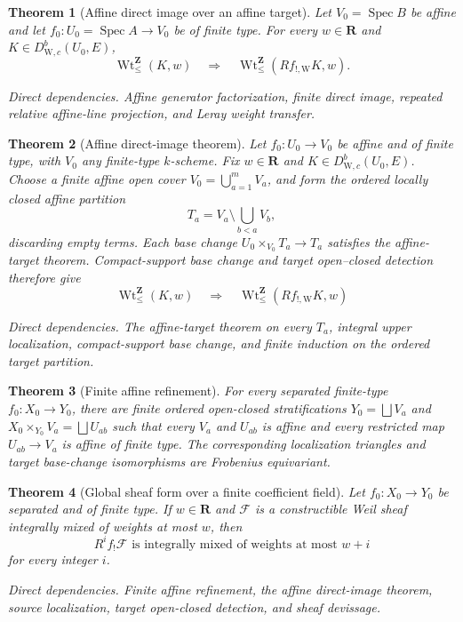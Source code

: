 \documentclass[10pt]{article}
\newtheorem{theorem}{Theorem}[section]
\theoremstyle{definition}
\newcommand{\DW}{D^b_{\mathrm W,c}}
\newcommand{\IntWtLe}{\operatorname{Wt}^{\mathbf Z}_{\leq}}
\newcommand{\Spec}{\operatorname{Spec}}
\newcommand{\dep}[1]{\par\smallskip\noindent\textit{Direct dependencies.} #1\par}
\begin{document}
\begin{theorem}[Affine direct image over an affine target]
Let \(V_0=\Spec B\) be affine and let
\(f_0:U_0=\Spec A\to V_0\) be of finite type.  For every
\(w\in\mathbf R\) and \(K\in\DW(U_0,E)\),
\[
 \IntWtLe(K,w)\quad\Longrightarrow\quad
 \IntWtLe(Rf_{!,\mathrm W}K,w).
\]
\dep{Affine generator factorization, finite direct image, repeated relative
affine-line projection, and Leray weight transfer.}
\end{theorem}

\begin{theorem}[Affine direct-image theorem]
Let \(f_0:U_0\to V_0\) be affine and of finite type, with \(V_0\) any
finite-type \(k\)-scheme.  Fix \(w\in\mathbf R\) and
\(K\in\DW(U_0,E)\).  Choose a finite affine open cover
\(V_0=\bigcup_{a=1}^mV_a\), and form the ordered locally closed affine
partition
\[
 T_a=V_a\setminus\bigcup_{b<a}V_b,
\]
discarding empty terms.  Each base change
\(U_0\times_{V_0}T_a\to T_a\) satisfies the affine-target theorem.
Compact-support base change and target open--closed detection therefore give
\[
 \IntWtLe(K,w)\quad\Longrightarrow\quad
 \IntWtLe(Rf_{!,\mathrm W}K,w)
\]
\dep{The affine-target theorem on every \(T_a\), integral upper
localization, compact-support base change, and finite induction on the
ordered target partition.}
\end{theorem}

\begin{theorem}[Finite affine refinement]
For every separated finite-type \(f_0:X_0\to Y_0\), there are finite ordered
open-closed stratifications \(Y_0=\bigsqcup V_a\) and
\(X_0\times_{Y_0}V_a=\bigsqcup U_{ab}\) such that every \(V_a\) and
\(U_{ab}\) is affine and every restricted map \(U_{ab}\to V_a\) is affine
of finite type.  The corresponding localization triangles and target
base-change isomorphisms are Frobenius equivariant.
\end{theorem}

\begin{theorem}[Global sheaf form over a finite coefficient field]
Let \(f_0:X_0\to Y_0\) be separated and of finite type.  If
\(w\in\mathbf R\) and \(\mathcal F\) is a constructible Weil sheaf
integrally mixed of weights
at most \(w\),
then
\[
                 R^if_!\mathcal F
       \text{ is integrally mixed of weights at most }w+i
\]
for every integer \(i\).
\dep{Finite affine refinement, the affine direct-image theorem, source
localization, target open-closed detection, and sheaf devissage.}
\end{theorem}
\end{document}
